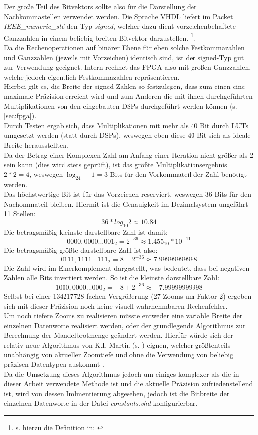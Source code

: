 \documentclass[a4paper,12pt,onesided]{report}
\begin{document}
Der große Teil des Bitvektors sollte also für die Darstellung der Nachkommastellen verwendet werden.
Die Sprache VHDL liefert im Packet \textit{IEEE\_numeric\_std} den Typ \textit{signed}, welcher dazu dient vorzeichenbehaftete Ganzzahlen in einem beliebig breiten Bitvektor darzustellen. \footnote{s. hierzu die Definition in: \cite{ieeeNumeric}}.\\
Da die Rechenoperationen auf binärer Ebene für eben solche Festkommazahlen und Ganzzahlen (jeweils mit Vorzeichen) identisch sind, ist der signed-Typ gut zur Verwendung geeignet.
Intern rechnet das FPGA also mit großen Ganzzahlen, welche jedoch eigentlich Festkommazahlen repräsentieren.\\
Hierbei gilt es, die Breite der signed Zahlen so festzulegen, dass zum einen eine maximale Präzision erreicht wird und zum Anderen die mit ihnen durchgeführten Multiplikationen von den eingebauten DSPs durchgeführt werden können (s. \autoref{sec:fpga}).\\
Durch Testen ergab sich, dass Multiplikationen mit mehr als 40 Bit durch LUTs umgesetzt werden (statt durch DSPs), weswegen eben diese 40 Bit sich als ideale Breite herausstellten.\\
Da der Betrag einer Komplexen Zahl am Anfang einer Iteration nicht größer als 2 sein kann (dies wird stets geprüft), ist das größte Multiplikationsergebnis $2*2=4$, weswegen $\log_24+1=3$ Bits für den Vorkommateil der Zahl benötigt werden.\\
Das höchstwertige Bit ist für das Vorzeichen reserviert, weswegen 36 Bits für den Nachommateil bleiben. Hiermit ist die Genauigkeit im Dezimalsystem ungefährt 11 Stellen:
\[36 * log_{10}2 \approx 10.84\]
Die betragsmäßig kleinste darstellbare Zahl ist damit:
\[0000,0000...001_2 = 2^{-36} \approx 1.455_{10}*10^{-11} \]
Die betragsmäßig größte darstellbare Zahl ist also:
\[0111,1111...111_2 = 8 - 2^{-36} \approx 7.99999999998 \]
Die Zahl wird im Einerkomplement dargestellt, was bedeutet, dass bei negativen Zahlen alle Bits invertiert werden. So ist die kleinste darstellbare Zahl:
\[1000,0000...000_2 = -8 + 2^{-36} \approx -7.99999999998 \]
Selbst bei einer 134217728-fachen Vergrößerung (27 Zooms um Faktor 2) ergeben sich mit dieser Präzision noch keine visuell wahrnehmbaren Rechenfehler.\\
Um noch tiefere Zooms zu realisieren müsste entweder eine variable Breite der einzelnen Datenworte realisiert werden, oder der grundlegende Algorithmus zur Berechnung der Mandelbrotmenge geändert werden.
Hierfür würde sich der relativ neue Algorithmus von K.I. Martin (s. \cite{SUPERFRACTALTHINGMATHS}) eignen, welcher größtenteils unabhängig von aktueller Zoomtiefe und ohne die Verwendung von beliebig präzisen Datentypen auskommt \cite{SUPERFRACTALTHINGMATHS}.\\
Da die Umsetzung dieses Algorithmus jedoch um einiges komplexer als die in dieser Arbeit verwendete Methode ist und die aktuelle Präzision zufriedenstellend ist, wird von dessen Imlmentierung abgesehen, jedoch ist die Bitbreite der einzelnen Datenworte in der Datei \textit{constants.vhd} konfigurierbar.
\end{document}
